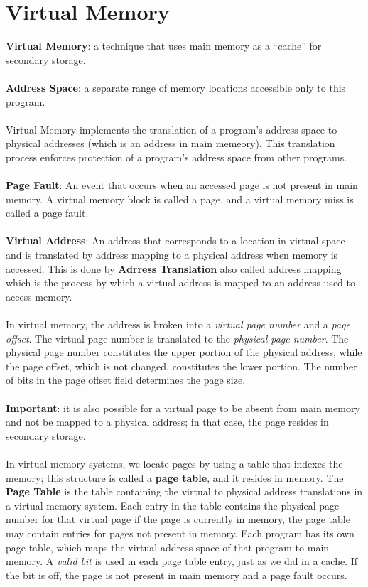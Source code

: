 \documentclass[letterpaper,c12pt]{article}
\begin{document}
\section{Virtual Memory}
\textbf{Virtual Memory}: a technique that uses main memory as a “cache” for secondary storage.\\\\
\textbf{Address Space}: a separate range of memory locations accessible only to this program.\\\\
Virtual Memory implements the translation of a program’s address space to physical addresses (which is an address in main memeory). This translation process enforces protection of a program’s address space from other programs.\\\\
\textbf{Page Fault}: An event that occurs when an accessed page is not present in main memory. A virtual memory block is called a page, and a virtual memory miss is called a page fault.\\\\
\textbf{Virtual Address}: An address that corresponds to a location in virtual space and is translated by address mapping to a physical address when memory is accessed. This is done by \textbf{Adrress Translation} also called address mapping which is the process by which a virtual address is mapped to an address used to access memory.\\\\
In virtual memory, the address is broken into a \textit{virtual page number} and a \textit{page offset}. The virtual page number is translated to the \textit{physical page number}. The physical page number constitutes the upper portion of the physical address, while the page offset, which is not changed, constitutes the lower portion. The number of bits in the page offset field determines the page size.\\\\
\textbf{Important}: it is also possible for a virtual page to be absent from main memory and not be mapped to a physical address; in that case, the page resides in secondary storage.\\\\
In virtual memory systems, we locate pages by using a table that indexes the memory; this structure is called a \textbf{page table}, and it resides in memory. The \textbf{Page Table} is the table containing the virtual
to physical address translations in a virtual memory system. Each entry in the table contains the physical page number for that virtual page if the page is currently in memory, the page table may contain entries for pages not present in memory. Each program has its own page table, which maps the virtual address space of that program to main memory. A \textit{valid bit} is used in each page table entry, just as we did in a cache. If the bit is off, the page is not present in main memory and a page fault occurs.\\\\
\end{document}
